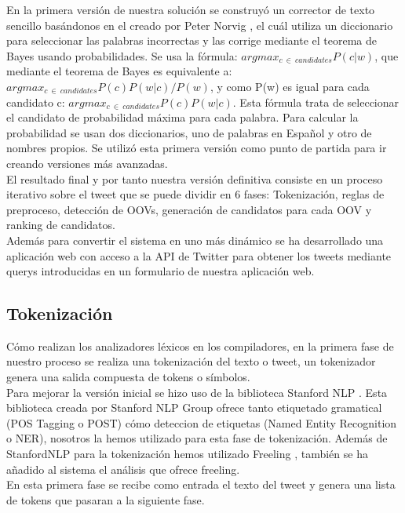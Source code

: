 \documentclass[spanish,12pt, a4paper,twoside]{paper}
\begin{document}
En la primera versión de nuestra solución se construyó un corrector de texto sencillo basándonos en el creado por Peter Norvig \cite{peternorvig}, el cuál utiliza un diccionario para seleccionar las palabras incorrectas y las corrige mediante el teorema de Bayes usando probabilidades. Se usa la fórmula: $argmax_{c\ \in\  candidates}P(c|w)$, que mediante el teorema de Bayes es equivalente a: $argmax_{c\ \in\  candidates}P(c) P(w|c) / P(w)$, y como P(w) es igual para cada candidato c: $argmax_{c\ \in\  candidates}P(c) P(w|c)$. Esta fórmula trata de seleccionar el candidato de probabilidad máxima para cada palabra. Para calcular la probabilidad se usan dos diccionarios, uno de palabras en Español y otro de nombres propios. Se utilizó esta primera versión como punto de partida para ir creando versiones más avanzadas.\\

El resultado final y por tanto nuestra versión definitiva consiste en un proceso iterativo sobre el tweet que se puede dividir en 6 fases: Tokenización, reglas de preproceso, detección de OOVs, generación de candidatos para cada OOV y ranking de candidatos.\\

Además para convertir el sistema en uno más dinámico se ha desarrollado una aplicación web con acceso a la API de Twitter para obtener los tweets mediante querys introducidas en un formulario de nuestra aplicación web.

\subsection{Tokenización}\label{sec:tokenizacion}
Cómo realizan los analizadores léxicos en los compiladores, en la primera fase de nuestro proceso se realiza una tokenización del texto o tweet, un tokenizador genera una salida compuesta de tokens o símbolos.\\

Para mejorar la versión inicial se hizo uso de la biblioteca Stanford NLP \cite{stanfordnlp}. Esta biblioteca creada por Stanford NLP Group ofrece tanto etiquetado gramatical (POS Tagging o POST) cómo deteccion de etiquetas (Named Entity Recognition o NER), nosotros la hemos utilizado para esta fase de tokenización. Además de StanfordNLP para la tokenización hemos utilizado Freeling \cite{freeling}, también se ha añadido al sistema el análisis que ofrece freeling.\\

En esta primera fase se recibe como entrada el texto del tweet y genera una lista de tokens que pasaran a la siguiente fase.
\end{document}
